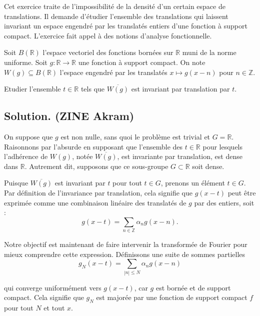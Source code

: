 Cet exercice traite de l'impossibilit{\'e} de la densit{\'e} d'un certain
espace de translations. Il demande d'{\'e}tudier l'ensemble des translations
qui laissent invariant un espace engendr{\'e} par les translat{\'e}s entiers
d'une fonction {\`a} support compact. L'exercice fait appel {\`a} des notions
d'analyse fonctionnelle.

\begin{exercise}
Soit $B (\mathbb{R})$ l'espace vectoriel des fonctions born{\'e}es sur
$\mathbb{R}$ muni de la norme uniforme. Soit $g : \mathbb{R} \to \mathbb{R}$
une fonction {\`a} support compact. On note $W (g) \subseteq B (\mathbb{R})$
l'espace engendr{\'e} par les translat{\'e}s $x \mapsto g (x - n)$ pour $n \in
\mathbb{Z}$.

Etudier l'ensemble $t \in \mathbb{R}$ tels que $\overline{W (g)}$ est
invariant par translation par $t$.
\end{exercise}

\subsection*{Solution. (ZINE Akram)}

On suppose que $g$ est non nulle, sans quoi le probl{\`e}me est trivial et $G
=\mathbb{R}$. Raisonnons par l'absurde en supposant que l'ensemble des $t \in
\mathbb{R}$ pour lesquels l'adh{\'e}rence de $W (g)$, not{\'e}e $\overline{W
(g)}$, est invariante par translation, est dense dans $\mathbb{R}$. Autrement
dit, supposons que ce sous-groupe $G \subset \mathbb{R}$ soit dense.

Puisque $\overline{W (g)}$ est invariant par $t$ pour tout $t \in G$, prenons
un {\'e}l{\'e}ment $t \in G$. Par d{\'e}finition de l'invariance par
translation, cela signifie que $g (x - t)$ peut {\^e}tre exprim{\'e}e comme
une combinaison lin{\'e}aire des translat{\'e}s de $g$ par des entiers, soit :
\[ g (x - t) = \sum_{n \in \mathbb{Z}} \alpha_n g (x - n) . \]


Notre objectif est maintenant de faire intervenir la transform{\'e}e de
Fourier pour mieux comprendre cette expression. D{\'e}finissons une suite de
sommes partielles
\[ g_N (x - t) = \sum_{|n| \leq N} \alpha_n g (x - n) \]


qui converge uniform{\'e}ment vers $g (x - t)$, car $g$ est born{\'e}e et de
support compact. Cela signifie que $g_N$ est major{\'e}e par une fonction de
support compact $f$ pour tout $N$ et tout $x$.

